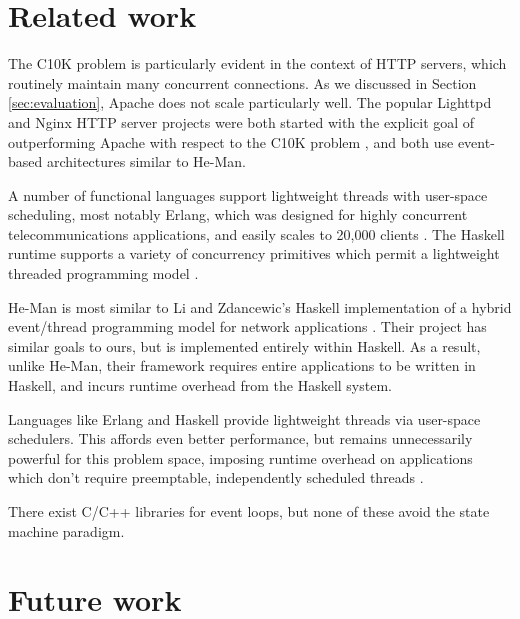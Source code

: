 \documentclass[preprint]{sigplanconf}
\begin{document}

\section{Related work}

The C10K problem is particularly evident in the context of HTTP
servers, which routinely maintain many concurrent connections. As we
discussed in Section \ref{sec:evaluation}, Apache does not scale
particularly well. The popular Lighttpd and Nginx HTTP server projects
were both started with the explicit goal of outperforming Apache with
respect to the C10K problem \cite{Lighttpd,Nginx}, and both use
event-based architectures similar to He-Man.

A number of functional languages support lightweight threads with
user-space scheduling, most notably Erlang, which was designed for
highly concurrent telecommunications applications, and easily scales
to 20,000 clients \cite{Hellstrom}. The Haskell runtime supports a
variety of concurrency primitives which permit a lightweight threaded
programming model \cite{LiEtAl}.


He-Man is most similar to Li and Zdancewic's Haskell implementation of
a hybrid event/thread programming model for network applications
\cite{LiZdancewic}.  Their project has similar goals to ours, but is
implemented entirely within Haskell. As a result, unlike He-Man, their
framework requires entire applications to be written in Haskell, and
incurs runtime overhead from the Haskell system.


Languages like Erlang and Haskell provide lightweight threads via user-space
schedulers. This affords even better performance, but remains unnecessarily
powerful for this problem space, imposing runtime overhead on applications which
don't require preemptable, independently scheduled threads \cite{Vinoski}.

There exist C/C++ libraries for event loops\cite{libevent}, but none of these
avoid the state machine paradigm.

\section{Future work}
\end{document}
